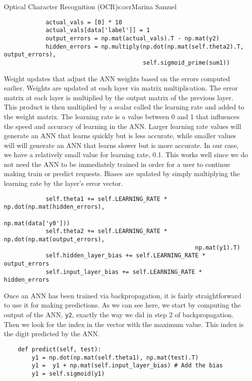 \begin{aosachapter}{Optical Character Recognition (OCR)}{s:ocr}{Marina Samuel}
\begin{verbatim}
            actual_vals = [0] * 10 
            actual_vals[data['label']] = 1
            output_errors = np.mat(actual_vals).T - np.mat(y2)
            hidden_errors = np.multiply(np.dot(np.mat(self.theta2).T, output_errors), 
                                        self.sigmoid_prime(sum1))
\end{verbatim}

Weight updates that adjust the ANN weights based on the errors computed
earlier. Weights are updated at each layer via matrix multiplication.
The error matrix at each layer is multiplied by the output matrix of the
previous layer. This product is then multiplied by a scalar called the
learning rate and added to the weight matrix. The learning rate is a
value between 0 and 1 that influences the speed and accuracy of learning
in the ANN. Larger learning rate values will generate an ANN that learns
quickly but is less accurate, while smaller values will will generate an
ANN that learns slower but is more accurate. In our case, we have a
relatively small value for learning rate, 0.1. This works well since we
do not need the ANN to be immediately trained in order for a user to
continue making train or predict requests. Biases are updated by simply
multiplying the learning rate by the layer's error vector.

\begin{verbatim}
            self.theta1 += self.LEARNING_RATE * np.dot(np.mat(hidden_errors), 
                                                       np.mat(data['y0']))
            self.theta2 += self.LEARNING_RATE * np.dot(np.mat(output_errors), 
                                                       np.mat(y1).T)
            self.hidden_layer_bias += self.LEARNING_RATE * output_errors
            self.input_layer_bias += self.LEARNING_RATE * hidden_errors
\end{verbatim}

\label{testing-a-trained-network-ocr.py}

Once an ANN has been trained via backpropagation, it is fairly
straightforward to use it for making predictions. As we can see here, we
start by computing the output of the ANN, \texttt{y2}, exactly the way
we did in step 2 of backpropagation. Then we look for the index in the
vector with the maximum value. This index is the digit predicted by the
ANN.

\begin{verbatim}
    def predict(self, test):
        y1 = np.dot(np.mat(self.theta1), np.mat(test).T)
        y1 =  y1 + np.mat(self.input_layer_bias) # Add the bias
        y1 = self.sigmoid(y1)


\end{verbatim}
\end{aosachapter}
